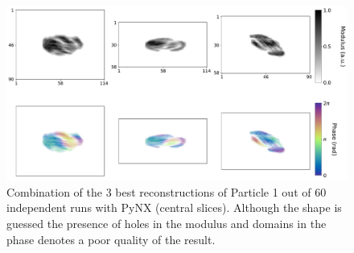 \begin{figure}[H]
    \centering
    \includegraphics[width=\textwidth]{figures/Phasing/exp_data_pynx1.pdf}
    \caption{Combination of the 3 best reconstructions of Particle 1 out of 60 independent runs with PyNX (central slices). 
    Although the shape is guessed the presence of holes in the modulus and domains in the phase denotes a poor quality 
    of the result.}
    \label{fig:pynx_rec1}
\end{figure}



